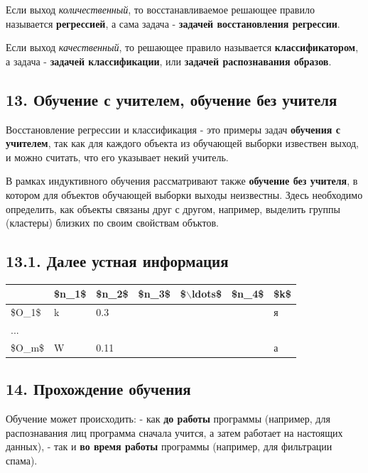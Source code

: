 Если выход \textit{количественный}, то восстанавливаемое решающее правило
называется \textbf{регрессией}, а сама задача -
\textbf{задачей восстановления регрессии}.

Если выход \textit{качественный}, то решающее правило называется
\textbf{классификатором}, а задача - \textbf{задачей классификации}, или
\textbf{задачей распознавания образов}.

\subsection{13. Обучение с учителем, обучение без учителя}

Восстановление регрессии и классификация - это примеры задач
\textbf{обучения с учителем}, так как для каждого объекта из обучающей выборки
извествен выход, и можно считать, что его указывает некий учитель.

В рамках индуктивного обучения рассматривают также
\textbf{обучение без учителя}, в котором для объектов обучающей выборки выходы
неизвестны. Здесь необходимо определить, как объекты связаны друг с
другом, например, выделить группы (кластеры) близких по своим свойствам
объктов.

\subsection{13.1. Далее устная информация}

\begin{table}[!h]
    \centering
    \begin{tabular}{|l|l|l|l|l|l|l|}
    \hline
        ~ & \$n\_1\$ & \$n\_2\$ & \$n\_3\$ & \$$\backslash$ldots\$ & \$n\_4\$ & \$k\$ \\ \hline
        \$O\_1\$ & k & 0.3 & ~ & ~ & ~ & я \\ \hline
        ... & ~ & ~ & ~ & ~ & ~ & ~ \\ \hline
        \$O\_m\$ & W & 0.11 & ~ & ~ & ~ & а \\ \hline
    \end{tabular}
\end{table}

\subsection{14. Прохождение обучения}

Обучение может происходить:
- как \textbf{до работы} программы (например, для распознавания
лиц программа сначала учится, а затем работает на настоящих данных),
- так и \textbf{во время работы} программы (например, для фильтрации спама).

